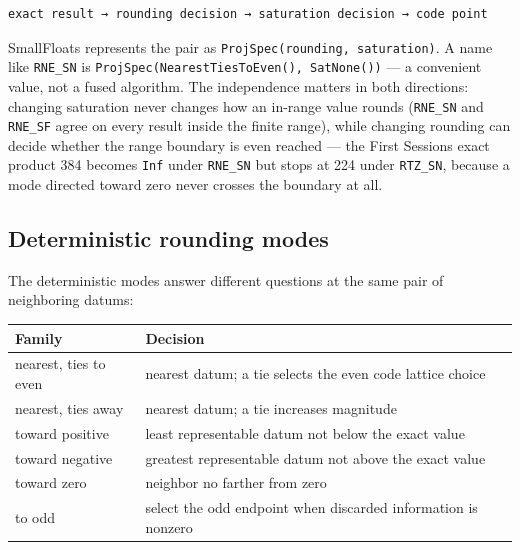 \label{7235523480760292834}{}



\begin{verbatim}
exact result → rounding decision → saturation decision → code point
\end{verbatim}



SmallFloats represents the pair as \texttt{ProjSpec(\allowbreak{}rounding, saturation)}. A name like \texttt{RNE\_\allowbreak{}SN} is \texttt{ProjSpec(\allowbreak{}NearestTiesToEven(\allowbreak{}), SatNone(\allowbreak{}))} — a convenient value, not a fused algorithm. The independence matters in both directions: changing saturation never changes how an in-range value rounds (\texttt{RNE\_\allowbreak{}SN} and \texttt{RNE\_\allowbreak{}SF} agree on every result inside the finite range), while changing rounding can decide whether the range boundary is even reached — the First Session{\textquotesingle}s exact product 384 becomes \texttt{Inf} under \texttt{RNE\_\allowbreak{}SN} but stops at 224 under \texttt{RTZ\_\allowbreak{}SN}, because a mode directed toward zero never crosses the boundary at all.



\subsection{Deterministic rounding modes}



\label{1054262421752722322}{}


The deterministic modes answer different questions at the same pair of neighboring datums:




\begin{table}[h]
\centering
\begin{tabulary}{\linewidth}{L L}
\toprule
Family & Decision \\
\toprule
nearest, ties to even & nearest datum; a tie selects the even code lattice choice \\
nearest, ties away & nearest datum; a tie increases magnitude \\
toward positive & least representable datum not below the exact value \\
toward negative & greatest representable datum not above the exact value \\
toward zero & neighbor no farther from zero \\
to odd & select the odd endpoint when discarded information is nonzero \\
\bottomrule
\end{tabulary}

\end{table}



